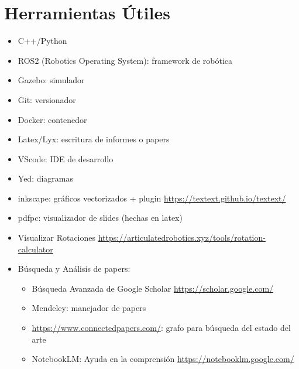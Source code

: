 \documentclass[a4paper,	11pt]{article}
\begin{document}
\section{Herramientas Útiles}


\begin{itemize}
    \item C++/Python
    \item ROS2 (Robotics Operating System): framework de robótica
    \item Gazebo: simulador
    \item Git: versionador
    \item Docker: contenedor
    \item Latex/Lyx: escritura de informes o papers
    \item VScode: IDE de desarrollo
    \item Yed: diagramas
    \item inkscape: gráficos vectorizados + plugin \url{https://textext.github.io/textext/}
    \item pdfpc: visualizador de slides (hechas en latex)
    \item Visualizar Rotaciones \url{https://articulatedrobotics.xyz/tools/rotation-calculator}
    \item Búsqueda y Análisis de papers:
    \begin{itemize}
        \item Búsqueda Avanzada de Google Scholar \url{https://scholar.google.com/}
        \item Mendeley: manejador de papers
        \item \url{https://www.connectedpapers.com/}: grafo para búsqueda del estado del arte
        \item NotebookLM: Ayuda en la comprensión \url{https://notebooklm.google.com/}
    \end{itemize}
\end{itemize}
\end{document}
